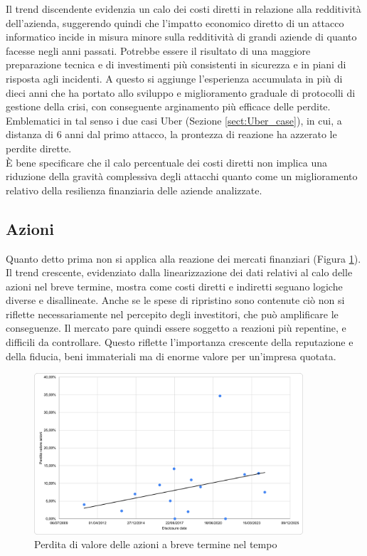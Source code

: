 \documentclass[12pt,a4paper,twoside]{report}
\begin{document}
Il trend discendente evidenzia un calo dei costi diretti in relazione alla redditivit\`a dell'azienda, 
suggerendo quindi che l'impatto economico diretto di un attacco informatico incide in misura minore sulla 
redditivit\`a di grandi aziende di quanto facesse negli anni passati. 
Potrebbe essere il risultato di una maggiore preparazione tecnica e di investimenti pi\`u 
consistenti in sicurezza e in piani di risposta agli incidenti. A questo si aggiunge l'esperienza accumulata
in pi\`u di dieci anni che ha portato allo sviluppo e miglioramento graduale di protocolli di gestione della
crisi, con conseguente arginamento pi\`u efficace delle perdite. Emblematici in tal senso i due casi Uber (Sezione \ref{sect:Uber_case}), 
in cui, a distanza di 6 anni dal primo attacco, la prontezza di reazione ha azzerato le perdite dirette.\\
\`E bene specificare che il calo percentuale dei costi diretti non implica una riduzione della gravit\`a complessiva degli attacchi
quanto come un miglioramento relativo della resilienza finanziaria delle aziende analizzate.\\

\subsection{Azioni}
Quanto detto prima non si applica alla reazione dei mercati finanziari (Figura \ref{fig:stockloss}).
Il trend crescente, evidenziato dalla linearizzazione dei dati relativi al calo delle azioni nel breve termine,
mostra come costi diretti e indiretti seguano logiche diverse e disallineate. Anche se le spese di ripristino 
sono contenute ci\`o non si riflette necessariamente nel percepito degli investitori, che pu\`o amplificare le conseguenze.
Il mercato pare quindi essere soggetto a reazioni pi\`u repentine, e difficili da controllare. Questo riflette l'importanza 
crescente della reputazione e della fiducia, beni immateriali ma di enorme  valore per un'impresa quotata.

\begin{figure}[H]
    \centering
    \includegraphics[width=10cm]{figures/stocks-date.png}
    \caption{Perdita di valore delle azioni a breve termine nel tempo}
    \label{fig:stockloss}
\end{figure}
\end{document}
